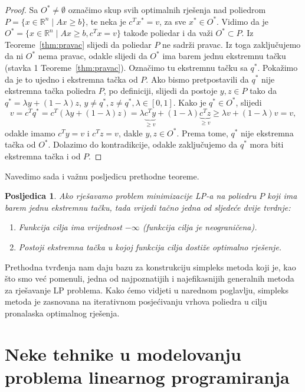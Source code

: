 \documentclass[a4paper, utf8, 11pt, colorlinks]{book}
\newtheorem{poslje}{Posljedica}[chapter]
\theoremstyle{definition}
\begin{document}
\begin{proof}
         Sa $O^* \not = \emptyset$ označimo skup svih optimalnih rješenja  nad poliedrom $P= \{ x \in \mathbb{R}^n \mid A x \geq b \}$, te neka je $c^T x^* = v$, za sve $x^* \in O^*$. Vidimo da je 
         $O^* = \{ x \in \mathbb{R}^n \mid A x \geq b, c^T x = v  \}$ takođe poliedar i da važi $O^* \subset P$. Iz Teoreme~\ref{thm:pravac} slijedi da poliedar $P$ ne sadrži pravac. Iz toga zaključujemo da ni $O^*$ nema pravac, odakle slijedi da $O^*$ ima barem jednu ekstremnu tačku (stavka 1 Teoreme~\ref{thm:pravac}). Označimo tu ekstremnu tačku sa $q^*$. Pokažimo da je to ujedno i ekstremna tačka od $P$.  Ako bismo pretpostavili da $q^*$ nije ekstremna tačka poliedra $P$, po definiciji, slijedi da postoje $y, z \in P$ tako da $q^* = \lambda y + ( 1 - \lambda ) z $, $y \neq q^*, z \neq q^*, \lambda \in [0, 1]$. Kako je $q^* \in O^*$, slijedi 
         $$ v = c^T q^* = c^T (  \lambda y + ( 1 - \lambda ) z ) = \lambda 
        \underbrace{ c^T y}_{ \geq v} + ( 1 - \lambda ) \underbrace{c^T z}_{\geq v} \geq \lambda v + (1 - \lambda) v = v,$$
        odakle imamo $c^T y = v$ i $c^T z = v$, dakle $y, z \in O^*$. Prema tome, $q^*$ nije ekstremna tačka od $O^*$. Dolazimo do kontradikcije, odakle zaključujemo da $q^*$ mora biti  ekstremna tačka i od  $P$.
\end{proof}
 

 Navedimo sada i važnu posljedicu prethodne teoreme.
 \begin{poslje}
Ako  rješavamo problem minimizacije LP-a na poliedru $P$ koji ima barem jednu ekstremnu tačku, tada vrijedi tačno jedna od sljedeće dvije tvrdnje:
   \begin{enumerate}
       \item Funkcija cilja ima vrijednost $- \infty$ (funkcija cilja je neograničena).
       \item Postoji ekstremna tačka u kojoj funkcija cilja dostiže optimalno rješenje. 
   \end{enumerate}
 \end{poslje}

 Prethodna tvrđenja nam daju bazu za konstrukciju simpleks metoda koji je, kao što smo već pomenuli, jedna od najpoznatijih i najefikasnijih generalnih metoda za rješavanje LP problema.
Kako ćemo vidjeti u narednom poglavlju, simpleks metoda je zasnovana na iterativnom posjećivanju vrhova poliedra  u cilju pronalaska optimalnog rješenja.

\section{Neke tehnike u modelovanju problema linearnog programiranja}
\end{document}
